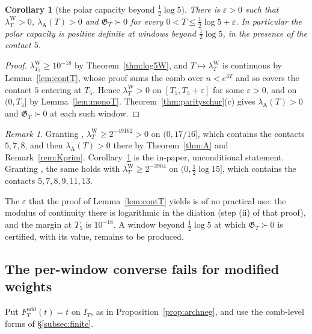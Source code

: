\documentclass[11pt]{amsart}
\newtheorem{corollary}[theorem]{Corollary}
\theoremstyle{definition}
\theoremstyle{remark}
\newtheorem{remark}[theorem]{Remark}
\newcommand{\IT}{I_T}
\newcommand{\lamW}{\lambda^{\mathrm W}_T}
\newcommand{\lamA}{\lambda_{\mathrm A}(T)}
\begin{document}
\begin{corollary}[the polar capacity beyond $\frac12\log5$]\label{cor:beyond5}
There is $\varepsilon>0$ such that $\lamW>0$, $\lamA>0$ and $\mathfrak G_T\succ0$ for every
$0<T\le\frac12\log5+\varepsilon$. In particular the polar capacity is positive definite at windows beyond
$\frac12\log5$, in the presence of the contact $5$.
\end{corollary}
\begin{proof}
$\lambda^{\mathrm W}_{T_5}\ge10^{-18}$ by Theorem~\ref{thm:log5W}, and $T\mapsto\lamW$ is continuous by
Lemma~\ref{lem:contT}, whose proof sums the comb over $n<e^{4T}$ and so covers the contact $5$ entering at $T_5$.
Hence $\lamW>0$ on $[T_5,T_5+\varepsilon]$ for some $\varepsilon>0$, and on $(0,T_5]$ by Lemma~\ref{lem:monoT}.
Theorem~\ref{thm:parityschur}(c) gives $\lamA>0$ and $\mathfrak G_T\succ0$ at each such window.
\end{proof}
\begin{remark}\label{rem:liu}
Granting \cite[Thm.~B]{Liu2026}, $\lamW\ge2^{-49162}>0$ on $(0,17/16]$, which contains the contacts
$5,7,8$, and then $\lamA>0$ there by Theorem~\ref{thm:A} and Remark~\ref{rem:Kprim}. Corollary~\ref{cor:beyond5}
is the in-paper, unconditional statement. Granting \cite{Mori15}, the same holds with $\lamW\ge2^{-2904}$ on
$(0,\frac12\log15]$, which contains the contacts $5,7,8,9,11,13$.
\end{remark}
The $\varepsilon$ that the proof of Lemma~\ref{lem:contT} yields is of no practical use: the modulus of continuity
there is logarithmic in the dilation (step (ii) of that proof), and the margin at $T_5$ is $10^{-18}$. A window
beyond $\frac12\log5$ at which $\mathfrak G_T\succ0$ is certified, with its value, remains to be produced.


\subsection{The per-window converse fails for modified weights}
Put $F^{\mathrm{odd}}_T(t)=t$ on $\IT$, as in Proposition~\ref{prop:archneg}, and use the comb-level forms of \S\ref{subsec:finite}.
\end{document}
